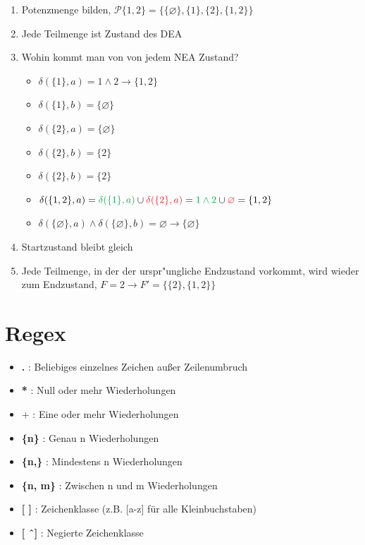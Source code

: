 \documentclass[11pt, a4paper]{scrartcl}
\newcommand{\gr}[1]{{\color{Green}#1}}
\newcommand{\rd}[1]{{\color{Red}#1}}
\begin{document}
\begin{enumerate}
    \item Potenzmenge bilden, $\mathcal{P}\{1, 2\} = \{\{\varnothing \}, \{1\}, \{2\}, \{1, 2\}\}$
    \item Jede Teilmenge ist Zustand des DEA
    \item Wohin kommt man von von jedem NEA Zustand?
    \begin{itemize}
        \item $\delta(\{1\}, a) = 1 \land 2 \rightarrow \{1, 2\}$ 
        \item $\delta(\{1\}, b) = \{\varnothing\}$
        \item $\delta(\{2\}, a) = \{\varnothing\}$
        \item $\delta(\{2\}, b) = \{2\}$
        \item $\delta(\{2\}, b) = \{2\}$
        \item $\delta(\{1, 2\}, a) = \gr{\delta(\{1\}, a)} \cup \rd{\delta(\{2\}, a)} = \gr{1 \land 2} \cup \rd{\varnothing} = \{1, 2\}$
        \item $\delta(\{\varnothing\}, a) \land \delta(\{\varnothing\}, b) = \varnothing \rightarrow \{\varnothing\}$
    \end{itemize}
    \item Startzustand bleibt gleich
    \item Jede Teilmenge, in der der urspr"ungliche Endzustand vorkommt, wird wieder zum Endzustand, $F = 2 \rightarrow F' = \{\{2\}, \{1, 2\}\}$
\end{enumerate}

\newpage


\section{Regex}


\begin{itemize}
    \item \textbf{.} : Beliebiges einzelnes Zeichen außer Zeilenumbruch
    \item \textbf{*} : Null oder mehr Wiederholungen
    \item \textbf{$+$} : Eine oder mehr Wiederholungen
    \item \textbf{\{n\}} : Genau n Wiederholungen
    \item \textbf{\{n,\}} : Mindestens n Wiederholungen
    \item \textbf{\{n, m\}} : Zwischen n und m Wiederholungen
    \item \textbf{[ ]} : Zeichenklasse (z.B. [a-z] für alle Kleinbuchstaben)
    \item \textbf{[ \^\ ]} : Negierte Zeichenklasse
\end{itemize}
\end{document}

